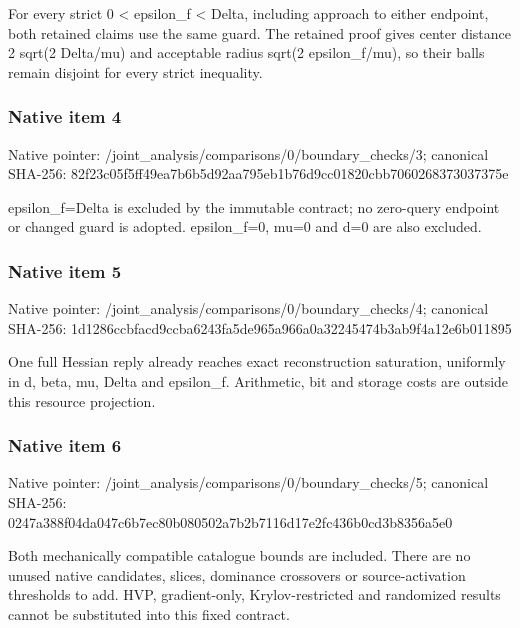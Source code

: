 \documentclass[10pt,a4paper]{article}
\begin{document}
\begingroup\raggedright\sloppy For every strict 0 < epsilon\_\allowbreak{}f < Delta,\allowbreak{} including approach to either endpoint,\allowbreak{} both retained claims use the same guard. The retained proof gives center distance 2 sqrt(2 Delta/\allowbreak{}mu) and acceptable radius sqrt(2 epsilon\_\allowbreak{}f/\allowbreak{}mu),\allowbreak{} so their balls remain disjoint for every strict inequality.\par\endgroup

\subsubsection{Native item 4}
Native pointer: /joint\_\allowbreak{}analysis/comparisons/0/boundary\_\allowbreak{}checks/3; canonical SHA-256: 82f23c05f5ff49ea7b6b5d92aa795eb1b76d9cc01820cbb7060268373037375e

\begingroup\raggedright\sloppy epsilon\_\allowbreak{}f=\allowbreak{}Delta is excluded by the immutable contract;\allowbreak{} no zero-query endpoint or changed guard is adopted. epsilon\_\allowbreak{}f=\allowbreak{}0,\allowbreak{} mu=\allowbreak{}0 and d=\allowbreak{}0 are also excluded.\par\endgroup

\subsubsection{Native item 5}
Native pointer: /joint\_\allowbreak{}analysis/comparisons/0/boundary\_\allowbreak{}checks/4; canonical SHA-256: 1d1286ccbfacd9ccba6243fa5de965a966a0a32245474b3ab9f4a12e6b011895

\begingroup\raggedright\sloppy One full Hessian reply already reaches exact reconstruction saturation,\allowbreak{} uniformly in d,\allowbreak{} beta,\allowbreak{} mu,\allowbreak{} Delta and epsilon\_\allowbreak{}f. Arithmetic,\allowbreak{} bit and storage costs are outside this resource projection.\par\endgroup

\subsubsection{Native item 6}
Native pointer: /joint\_\allowbreak{}analysis/comparisons/0/boundary\_\allowbreak{}checks/5; canonical SHA-256: 0247a388f04da047c6b7ec80b080502a7b2b7116d17e2fc436b0cd3b8356a5e0

\begingroup\raggedright\sloppy Both mechanically compatible catalogue bounds are included. There are no unused native candidates,\allowbreak{} slices,\allowbreak{} dominance crossovers or source-activation thresholds to add. HVP,\allowbreak{} gradient-only,\allowbreak{} Krylov-restricted and randomized results cannot be substituted into this fixed contract.\par\endgroup
\end{document}

